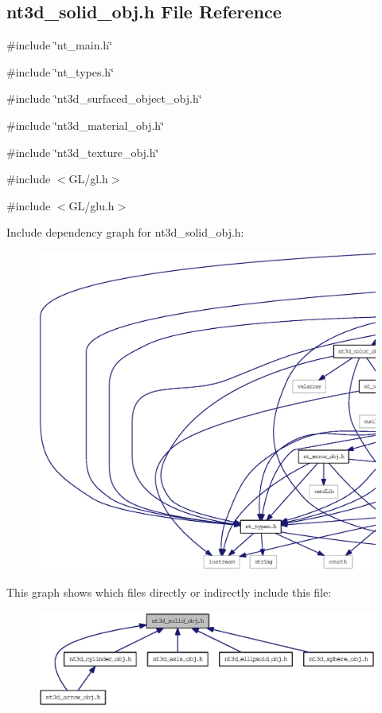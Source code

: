 \subsection{nt3d\_\-solid\_\-obj.h File Reference}
\label{nt3d__solid__obj_8h}
{\ttfamily \#include \char`\"{}nt\_\-main.h\char`\"{}}\par
{\ttfamily \#include \char`\"{}nt\_\-types.h\char`\"{}}\par
{\ttfamily \#include \char`\"{}nt3d\_\-surfaced\_\-object\_\-obj.h\char`\"{}}\par
{\ttfamily \#include \char`\"{}nt3d\_\-material\_\-obj.h\char`\"{}}\par
{\ttfamily \#include \char`\"{}nt3d\_\-texture\_\-obj.h\char`\"{}}\par
{\ttfamily \#include $<$GL/gl.h$>$}\par
{\ttfamily \#include $<$GL/glu.h$>$}\par
Include dependency graph for nt3d\_\-solid\_\-obj.h:
\nopagebreak
\begin{figure}[H]
\begin{center}
\leavevmode
\includegraphics[width=400pt]{nt3d__solid__obj_8h__incl}
\end{center}
\end{figure}
This graph shows which files directly or indirectly include this file:
\nopagebreak
\begin{figure}[H]
\begin{center}
\leavevmode
\includegraphics[width=400pt]{nt3d__solid__obj_8h__dep__incl}
\end{center}
\end{figure}
